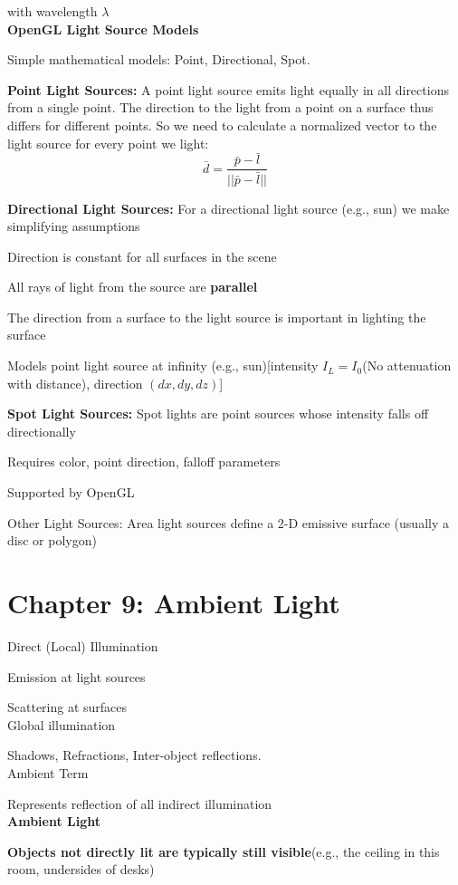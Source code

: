 \documentclass[]{report}
\begin{document}
with wavelength $\lambda$\\
\textbf{OpenGL Light Source Models}

Simple mathematical models: Point, Directional, Spot.

\textbf{Point Light Sources: }A point light source emits light equally in all directions from
a single point. The direction to the light from a point on a surface thus
differs for different points. So we need to calculate a
normalized vector to the light
source for every point we light:
$$\bar{d} = \frac{\bar{p} - \bar{l}}{||\bar{p} - \bar{l}||}$$

\textbf{Directional Light Sources: }For a directional light source (e.g., sun) we make simplifying
assumptions

Direction is constant for all surfaces in the scene

All rays of light from the source are \textbf{parallel}

The direction from a surface to the light source is important in
lighting the surface

Models point light source at infinity (e.g., sun)[intensity $I_L = I_0$(No attenuation with distance), direction $(dx,dy,dz)$]

\textbf{Spot Light Sources: }Spot lights are point sources whose intensity falls off
directionally

Requires color, point
direction, falloff
parameters

Supported by OpenGL

Other Light Sources: 
Area light sources define a 2-D emissive surface (usually a
disc or polygon)


\section*{Chapter 9: Ambient Light}

Direct (Local) Illumination

Emission at light sources

Scattering at surfaces\\
Global illumination

Shadows, Refractions, Inter-object reflections.\\
Ambient Term

Represents reflection of all indirect illumination\\
\textbf{Ambient Light}

\textbf{Objects not directly lit are typically still visible}(e.g., the ceiling in this room, undersides of desks)
\end{document}
